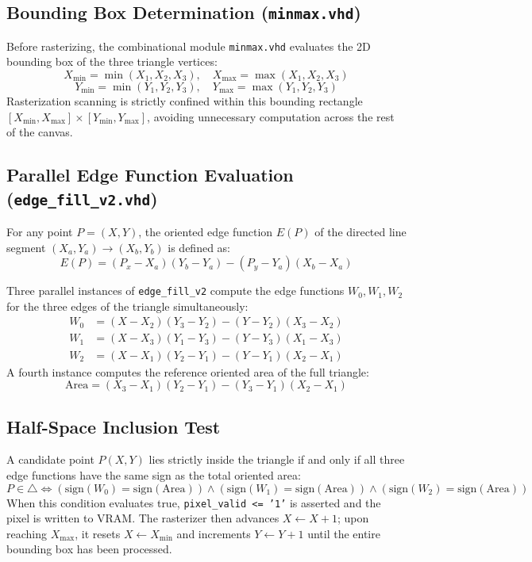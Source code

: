 \subsection{Bounding Box Determination (\texttt{minmax.vhd})}
Before rasterizing, the combinational module \texttt{minmax.vhd} evaluates the 2D bounding box of the three triangle vertices:
\begin{equation}
X_{\min} = \min(X_1, X_2, X_3), \quad X_{\max} = \max(X_1, X_2, X_3)
\end{equation}
\begin{equation}
Y_{\min} = \min(Y_1, Y_2, Y_3), \quad Y_{\max} = \max(Y_1, Y_2, Y_3)
\end{equation}
Rasterization scanning is strictly confined within this bounding rectangle $[X_{\min}, X_{\max}] \times [Y_{\min}, Y_{\max}]$, avoiding unnecessary computation across the rest of the canvas.

\subsection{Parallel Edge Function Evaluation (\texttt{edge\_fill\_v2.vhd})}
For any point $P = (X, Y)$, the oriented edge function $E(P)$ of the directed line segment $(X_a, Y_a) \to (X_b, Y_b)$ is defined as:
\begin{equation}
E(P) = (P_x - X_a)(Y_b - Y_a) - (P_y - Y_a)(X_b - X_a)
\end{equation}

Three parallel instances of \texttt{edge\_fill\_v2} compute the edge functions $W_0, W_1, W_2$ for the three edges of the triangle simultaneously:
\begin{align}
W_0 &= (X - X_2)(Y_3 - Y_2) - (Y - Y_2)(X_3 - X_2) \\
W_1 &= (X - X_3)(Y_1 - Y_3) - (Y - Y_3)(X_1 - X_3) \\
W_2 &= (X - X_1)(Y_2 - Y_1) - (Y - Y_1)(X_2 - X_1)
\end{align}
A fourth instance computes the reference oriented area of the full triangle:
\begin{equation}
\text{Area} = (X_3 - X_1)(Y_2 - Y_1) - (Y_3 - Y_1)(X_2 - X_1)
\end{equation}

\subsection{Half-Space Inclusion Test}
A candidate point $P(X, Y)$ lies strictly inside the triangle if and only if all three edge functions have the same sign as the total oriented area:
\begin{equation}
P \in \triangle \iff \left(\text{sign}(W_0) = \text{sign}(\text{Area})\right) \land \left(\text{sign}(W_1) = \text{sign}(\text{Area})\right) \land \left(\text{sign}(W_2) = \text{sign}(\text{Area})\right)
\end{equation}
When this condition evaluates true, \texttt{pixel\_valid <= '1'} is asserted and the pixel is written to VRAM. The rasterizer then advances $X \gets X + 1$; upon reaching $X_{\max}$, it resets $X \gets X_{\min}$ and increments $Y \gets Y + 1$ until the entire bounding box has been processed.

